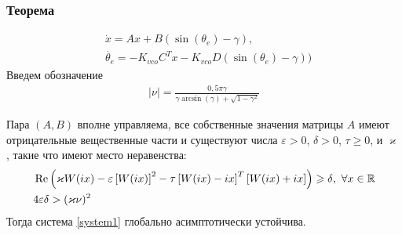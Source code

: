 \documentclass{beamer}
\begin{document}

\begin{frame}
\frametitle{Теорема}
\vspace{-4mm}
 \begin{equation}\label{system1}
 \begin{aligned}
 &\dot{x} = Ax + B(\operatorname{sin}(\theta_e) - \gamma) \text{,}\\
 &\dot{\theta_e} = -K_{vco}C^T x -K_{vco}D(\operatorname{sin}(\theta_e) - \gamma))
 \end{aligned}
\end{equation}
\vspace{-2.5mm}
Введем обозначение
 \begin{equation}
 \begin{aligned}
\mid\nu\mid = \frac{0,5\pi\gamma}{\gamma \operatorname{arcsin} (\gamma) + \sqrt{1-\gamma^2}}
 \end{aligned}
\end{equation}
\vspace{-3mm}
\begin{theorem}
Пара $(A, B)$ вполне управляема, все собственные значения матрицы $A$ имеют отрицательные вещественные части и существуют числа $\varepsilon > 0$, $\delta > 0$, $\tau \geqslant 0$, и $\varkappa$, такие что имеют место неравенства:\vspace{-2.5mm}
 \begin{align*}
&\operatorname{Re}\left( \varkappa W(ix)- \varepsilon\left[W(ix)\right]^2-\tau\left[ W(ix)-ix \right]^T\left[W(ix)+ix \right]\right) \geqslant \delta \text{,}\enskip\forall x \in \mathbb{R}\label{first_th_eq}\\
&4\varepsilon\delta > (\varkappa\nu)^2
\end{align*}
Тогда система \eqref{system1} глобально асимптотически устойчива.
\end{theorem}
\end{frame}

\end{document}
